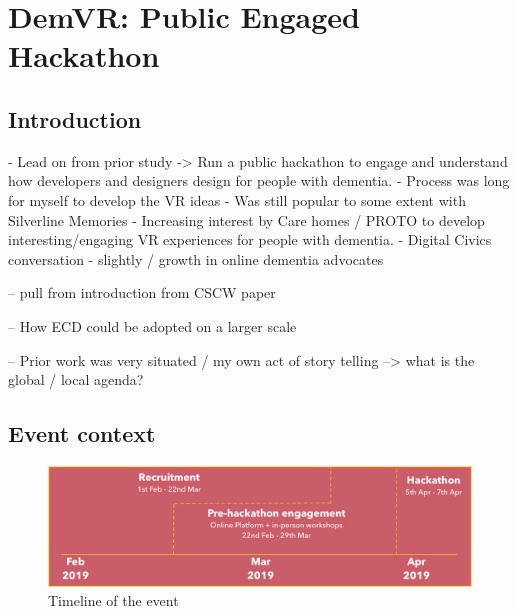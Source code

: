 \chapter{DemVR: Public Engaged Hackathon}
\label{DemVR}

\section{Introduction}
\label{sec:DemVRIntroduction}

- Lead on from prior study -> Run a public hackathon to engage and understand how developers and designers design for people with dementia. 
- Process was long for myself to develop the VR ideas
- Was still popular to some extent with Silverline Memories - Increasing interest by Care homes / PROTO to develop interesting/engaging VR experiences for people with dementia. 
- Digital Civics conversation - slightly / growth in online dementia advocates

-- pull from introduction from CSCW paper

-- How ECD could be adopted on a larger scale

-- Prior work was very situated / my own act of story telling --> what is the global / local agenda?

\section{Event context}
\label{sec:DemVRContextEvent}

\begin{figure}
\centering
\includegraphics[width=.8\linewidth]{Images/Timeline.jpg}
\caption{Timeline of the event}
\label{fig:DemVRTimeline}
\end{figure}

